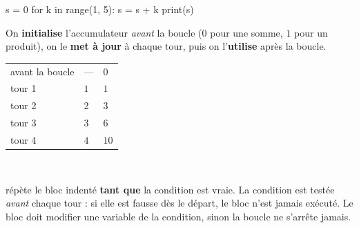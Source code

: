 \begin{savoirfaire}
\begin{codecote}[0.42]
\begin{pythoncol}
s = 0
for k in range(1, 5):
    s = s + k
print(s)
\end{pythoncol}

\medskip
On \textbf{initialise} l'accumulateur \emph{avant} la boucle ($0$ pour une somme, $1$ pour un produit), on le \textbf{met à jour} à chaque
tour, puis on l'\textbf{utilise} après la boucle.
\cote
{\renewcommand{\arraystretch}{1.25}%
\begin{tabularx}{\linewidth}{@{}YYY@{}}
\toprule
{} &  &  \\
\midrule
avant la boucle & — & $0$ \\
tour 1 & $1$ & $1$ \\
tour 2 & $2$ & $3$ \\
tour 3 & $3$ & $6$ \\
tour 4 & $4$ & $10$ \\
\bottomrule
\end{tabularx}}\\[1mm]
\end{codecote}
\end{savoirfaire}


\begin{codecote}[0.5]
\begin{definition}
\raggedright
{} répète le bloc indenté \textbf{tant que} la condition est vraie. La condition est testée \emph{avant} chaque
tour : si elle est fausse dès le départ, le bloc n'est jamais exécuté. Le bloc doit modifier une variable de la condition, sinon la
boucle ne s'arrête jamais.
\end{definition}
\cote
\centering
{}\\[0.5mm]
\end{codecote}

